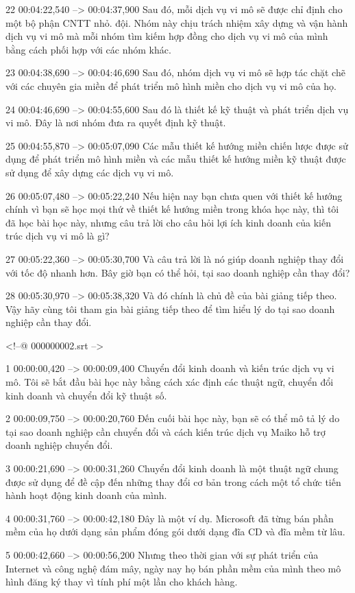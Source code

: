 22
00:04:22,540 --> 00:04:37,900
Sau đó, mỗi dịch vụ vi mô sẽ được chỉ định cho một bộ phận CNTT nhỏ.  đội.  Nhóm này chịu trách nhiệm xây dựng và vận hành dịch vụ vi mô mà mỗi nhóm tìm kiếm hợp đồng cho dịch vụ vi mô của mình bằng cách phối hợp với các nhóm khác.

23
00:04:38,690 --> 00:04:46,690
Sau đó, nhóm dịch vụ vi mô sẽ hợp tác chặt chẽ với các chuyên gia miền để phát triển mô hình miền cho dịch vụ vi mô của họ.

24
00:04:46,690 --> 00:04:55,600
Sau đó là thiết kế kỹ thuật và phát triển dịch vụ vi mô.  Đây là nơi nhóm đưa ra quyết định kỹ thuật.

25
00:04:55,870 --> 00:05:07,090
Các mẫu thiết kế hướng miền chiến lược được sử dụng để phát triển mô hình miền và các mẫu thiết kế hướng miền kỹ thuật được sử dụng để xây dựng các dịch vụ vi mô.

26
00:05:07,480 --> 00:05:22,240
Nếu hiện nay bạn chưa quen với thiết kế hướng chính vì bạn sẽ học mọi thứ về thiết kế hướng miền trong khóa học này, thì tôi đã học bài học này, nhưng câu trả lời cho câu hỏi lợi ích kinh doanh của kiến ​​trúc dịch vụ vi mô là gì?

27
00:05:22,360 --> 00:05:30,700
Và câu trả lời là nó giúp doanh nghiệp thay đổi với tốc độ nhanh hơn.  Bây giờ bạn có thể hỏi, tại sao doanh nghiệp cần thay đổi?

28
00:05:30,970 --> 00:05:38,320
Và đó chính là chủ đề của bài giảng tiếp theo.  Vậy hãy cùng tôi tham gia bài giảng tiếp theo để tìm hiểu lý do tại sao doanh nghiệp cần thay đổi.

<!--@ 000000002.srt -->

1
00:00:00,420 --> 00:00:09,400
Chuyển đổi kinh doanh và kiến ​​trúc dịch vụ vi mô.  Tôi sẽ bắt đầu bài học này bằng cách xác định các thuật ngữ, chuyển đổi kinh doanh và chuyển đổi kỹ thuật số.

2
00:00:09,750 --> 00:00:20,760
Đến cuối bài học này, bạn sẽ có thể mô tả lý do tại sao doanh nghiệp cần chuyển đổi và cách kiến ​​trúc dịch vụ Maiko hỗ trợ doanh nghiệp chuyển đổi.

3
00:00:21,690 --> 00:00:31,260
Chuyển đổi kinh doanh là một thuật ngữ chung được sử dụng
để đề cập đến những thay đổi cơ bản trong cách một tổ chức tiến hành hoạt động kinh doanh của mình.

4
00:00:31,760 --> 00:00:42,180
Đây là một ví dụ.  Microsoft đã từng bán phần mềm của họ dưới dạng sản phẩm đóng gói dưới dạng đĩa CD và đĩa mềm từ lâu.

5
00:00:42,660 --> 00:00:56,200
Nhưng theo thời gian với sự phát triển của Internet và công nghệ đám mây, ngày nay họ bán phần mềm của mình theo mô hình đăng ký thay vì tính phí một lần cho khách hàng.


